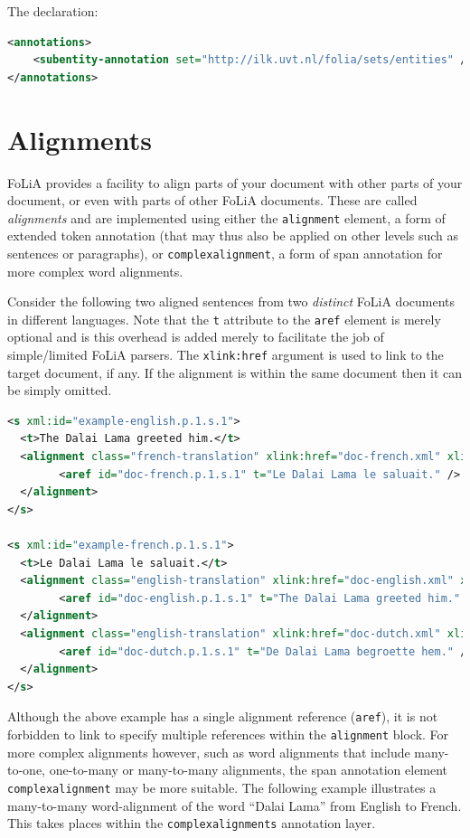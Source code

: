 \documentclass[a4paper,12pt]{report}
\begin{document}
The declaration:

\begin{lstlisting}[language=xml]
<annotations>
    <subentity-annotation set="http://ilk.uvt.nl/folia/sets/entities" />
</annotations>
\end{lstlisting}


\section{Alignments}

FoLiA provides a facility to align parts of your document with other parts of your document, or even with parts of other FoLiA documents. These are called \emph{alignments} and are implemented using either the \texttt{alignment} element, a form of extended token annotation (that may thus also be applied on other levels such as sentences or paragraphs), or \texttt{complexalignment}, a form of span annotation for more complex word alignments.

Consider the following two aligned sentences from two \emph{distinct} FoLiA documents in different languages. Note that the \texttt{t} attribute to the \texttt{aref} element is merely optional and is this overhead is added merely to facilitate the job of simple/limited FoLiA parsers. The \texttt{xlink:href} argument is used to link to the target document, if any. If the alignment is within the same document then it can be simply omitted.

\begin{lstlisting}[language=xml]
<s xml:id="example-english.p.1.s.1">
  <t>The Dalai Lama greeted him.</t>
  <alignment class="french-translation" xlink:href="doc-french.xml" xlink:type="simple">
        <aref id="doc-french.p.1.s.1" t="Le Dalai Lama le saluait." />
  </alignment>
</s>

<s xml:id="example-french.p.1.s.1">
  <t>Le Dalai Lama le saluait.</t>
  <alignment class="english-translation" xlink:href="doc-english.xml" xlink:type="simple">
        <aref id="doc-english.p.1.s.1" t="The Dalai Lama greeted him." />
  </alignment>
  <alignment class="english-translation" xlink:href="doc-dutch.xml" xlink:type="simple">
        <aref id="doc-dutch.p.1.s.1" t="De Dalai Lama begroette hem." />
  </alignment>
</s>
\end{lstlisting}


Although the above example has a single alignment reference (\texttt{aref}), it is not forbidden to link to specify multiple references within the \texttt{alignment} block. For more complex alignments however, such as word alignments that include many-to-one, one-to-many or many-to-many alignments, the span annotation element \texttt{complexalignment} may be more suitable. The following example illustrates a many-to-many word-alignment of the word ``Dalai Lama'' from English to French. This takes places within the \texttt{complexalignments} annotation layer.
\end{document}
